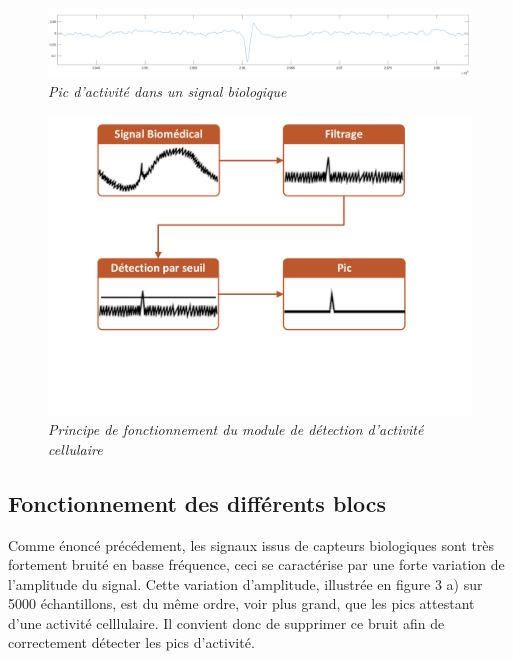 \documentclass[a4paper,12pt]{article}
\begin{document}
\begin{figure}[H]
\centering
\includegraphics[scale=0.18, keepaspectratio]{toto3.png}
\caption{\textit{Pic d'activité dans un signal biologique}}
\end{figure}

\begin{figure}[H]
\centering
\includegraphics[scale=0.5, keepaspectratio]{Dessin1.pdf}
\caption{\textit{Principe de fonctionnement du module de détection d'activité cellulaire}}
\end{figure}
\newpage

\subsection{Fonctionnement des différents blocs}
Comme énoncé précédement, les signaux issus de capteurs biologiques sont très fortement bruité en basse fréquence, ceci se caractérise par une forte variation de l'amplitude du signal. Cette variation d'amplitude, illustrée en figure 3 a) sur 5000 échantillons, est du même ordre, voir plus grand, que les pics attestant d'une activité celllulaire. Il convient donc de supprimer ce bruit afin de correctement détecter les pics d'activité.\\
\end{document}
